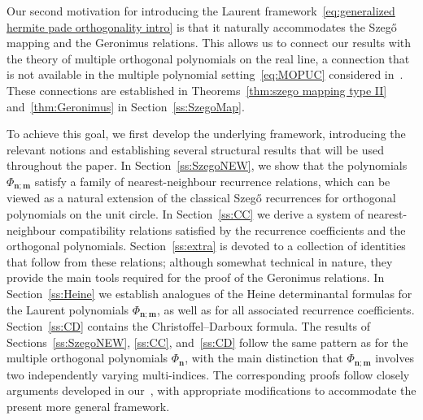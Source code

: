 \documentclass[reqno,centertags,11pt,draft]{amsart}
\begin{document}
Our second motivation for introducing the Laurent framework~\eqref{eq:generalized hermite pade orthogonality intro} is that it naturally accommodates the Szeg\H{o} mapping and the Geronimus relations. This allows us to connect our results with the theory of multiple orthogonal polynomials on the real line, a connection that is not available in the multiple polynomial setting~\eqref{eq:MOPUC} considered in~\cite{MOPUC1,MOPUC2,KVMOPUC}. These connections are established in Theorems~\ref{thm:szego mapping type II} and~\ref{thm:Geronimus} in Section~\ref{ss:SzegoMap}.

To achieve this goal, we first develop the underlying framework, introducing the relevant notions and establishing several structural results that will be used throughout the paper. In Section~\ref{ss:SzegoNEW}, we show that the polynomials $\Phi_{\bm{n};\bm{m}}$ satisfy a family of nearest-neighbour recurrence relations, which can be viewed as a natural extension of the classical Szeg\H{o} recurrences for orthogonal polynomials on the unit circle. In Section~\ref{ss:CC} we derive a system of nearest-neighbour compatibility relations satisfied by the recurrence coefficients and the orthogonal polynomials. Section~\ref{ss:extra} is devoted to a collection of identities that follow from these relations; although somewhat technical in nature, they provide the main tools required for the proof of the Geronimus relations. In Section~\ref{ss:Heine} we establish analogues of the Heine determinantal formulas for the Laurent polynomials $\Phi_{\bm{n};\bm{m}}$, as well as for all associated recurrence coefficients. Section~\ref{ss:CD} contains the Christoffel--Darboux formula.
The results of Sections~\ref{ss:SzegoNEW}, \ref{ss:CC}, and~\ref{ss:CD} follow the same pattern as for the multiple orthogonal polynomials $\Phi_{\bm{n}}$, with the main distinction that $\Phi_{\bm{n};\bm{m}}$ involves two independently varying multi-indices. 
The corresponding proofs follow closely arguments developed in our~\cite{KVMOPUC}, with appropriate modifications to accommodate the present more general framework. 


\end{document}
